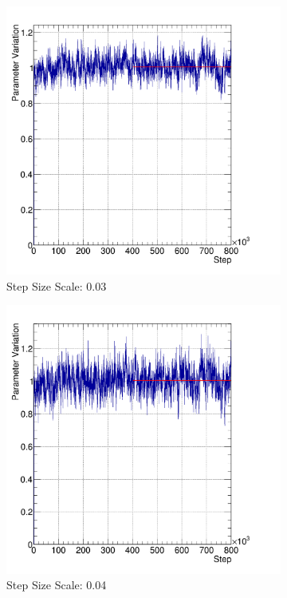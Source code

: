 \begin{figure}
\centering
\begin{subfigure}{.5\textwidth}
  \centering
  \includegraphics[width=0.73\linewidth]{figs/trace0}
  \caption{Step Size Scale: 0.03}
  \label{fig:trace0}
\end{subfigure}%
\begin{subfigure}{.5\textwidth}
  \centering
  \includegraphics[width=0.73\linewidth]{figs/trace1}
  \caption{Step Size Scale: 0.04}
  \label{fig:trace1}
\end{subfigure} \\
\begin{subfigure}{.5\textwidth}
  \centering

\end{subfigure}
\end{figure}
